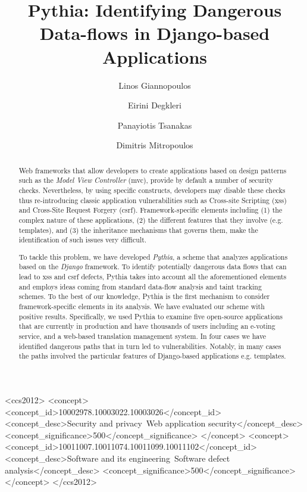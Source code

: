 \documentclass[sigconf]{acmart}
\begin{document}
\title{Pythia: Identifying Dangerous Data-flows in Django-based Applications}

\author{Linos Giannopoulos}

\author{Eirini Degkleri}

\author{Panayiotis Tsanakas}

\author{Dimitris Mitropoulos}

\begin{abstract}
Web frameworks that allow developers
to create applications based on design
patterns such as the
{\it Model View Controller} ({\sc mvc}),
provide by default a number of security checks.
Nevertheless,
by using specific constructs,
developers may disable these checks
thus re-introducing classic application
vulnerabilities such as Cross-site Scripting
({\sc xss}) and Cross-Site Request Forgery
({\sc csrf}).
Framework-specific elements including
(1) the complex nature of these applications,
(2) the different features that they involve
(e.g. templates),
and (3) the inheritance mechanisms
that governs them,
make the identification
of such issues very difficult.

To tackle this problem,
we have developed {\it Pythia},
a scheme that analyzes applications
based on the {\it Django} framework.
To identify potentially dangerous
data flows that can lead to
{\sc xss} and {\sc csrf} defects,
Pythia takes into account all the
aforementioned elements and employs
ideas coming from standard
data-flow analysis and taint tracking schemes.
To the best of our knowledge,
Pythia is the first mechanism
to consider framework-specific
elements in its analysis.
We have evaluated our scheme
with positive results.
Specifically,
we used Pythia to examine five open-source
applications that are currently in production
and have thousands of users
including an e-voting service,
and a web-based translation
management system.
In four cases we have identified dangerous paths
that in turn led to vulnerabilities.
Notably,
in many cases the paths involved the
particular features of Django-based
applications e.g. templates.
\end{abstract}

\begin{CCSXML}
<ccs2012>
<concept>
<concept_id>10002978.10003022.10003026</concept_id>
<concept_desc>Security and privacy~Web application security</concept_desc>
<concept_significance>500</concept_significance>
</concept>
<concept>
<concept_id>10011007.10011074.10011099.10011102</concept_id>
<concept_desc>Software and its engineering~Software defect analysis</concept_desc>
<concept_significance>500</concept_significance>
</concept>
</ccs2012>
\end{CCSXML}
\end{document}
